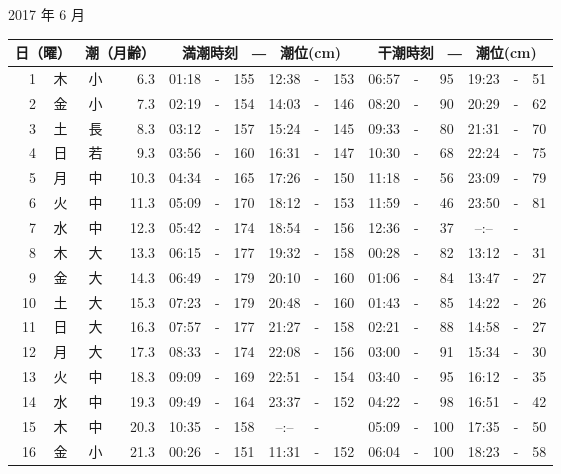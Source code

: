 \documentclass[12pt.a4j]{jsarticle}
\begin{document}
\begin{center}
 {\large 2017 年  6 月}\\
 \begin{table}[ht]
    \begin{tabular}{|rc|cr|ccrccr|ccrccr|}
    \hline
    \multicolumn{2}{|c|}{日（曜）} & \multicolumn{2}{c|}{潮（月齢）} & \multicolumn{6}{c|}{満潮時刻　―　潮位(cm)} & \multicolumn{6}{c|}{干潮時刻　―　潮位(cm)} \\
 \hline
 1 & 木 & 小 &  6.3 &  01:18 &-& 155  &  12:38 &-& 153  &   06:57 &-&  95  &   19:23 &-&  51  \\
 2 & 金 & 小 &  7.3 &  02:19 &-& 154  &  14:03 &-& 146  &   08:20 &-&  90  &   20:29 &-&  62  \\
 3 & 土 & 長 &  8.3 &  03:12 &-& 157  &  15:24 &-& 145  &   09:33 &-&  80  &   21:31 &-&  70  \\
 4 & 日 & 若 &  9.3 &  03:56 &-& 160  &  16:31 &-& 147  &   10:30 &-&  68  &   22:24 &-&  75  \\
 5 & 月 & 中 & 10.3 &  04:34 &-& 165  &  17:26 &-& 150  &   11:18 &-&  56  &   23:09 &-&  79  \\
 6 & 火 & 中 & 11.3 &  05:09 &-& 170  &  18:12 &-& 153  &   11:59 &-&  46  &   23:50 &-&  81  \\
 7 & 水 & 中 & 12.3 &  05:42 &-& 174  &  18:54 &-& 156  &   12:36 &-&  37  &   --:-- &-&     \\
 8 & 木 & 大 & 13.3 &  06:15 &-& 177  &  19:32 &-& 158  &   00:28 &-&  82  &   13:12 &-&  31  \\
 9 & 金 & 大 & 14.3 &  06:49 &-& 179  &  20:10 &-& 160  &   01:06 &-&  84  &   13:47 &-&  27  \\
10 & 土 & 大 & 15.3 &  07:23 &-& 179  &  20:48 &-& 160  &   01:43 &-&  85  &   14:22 &-&  26  \\
11 & 日 & 大 & 16.3 &  07:57 &-& 177  &  21:27 &-& 158  &   02:21 &-&  88  &   14:58 &-&  27  \\
12 & 月 & 大 & 17.3 &  08:33 &-& 174  &  22:08 &-& 156  &   03:00 &-&  91  &   15:34 &-&  30  \\
13 & 火 & 中 & 18.3 &  09:09 &-& 169  &  22:51 &-& 154  &   03:40 &-&  95  &   16:12 &-&  35  \\
14 & 水 & 中 & 19.3 &  09:49 &-& 164  &  23:37 &-& 152  &   04:22 &-&  98  &   16:51 &-&  42  \\
15 & 木 & 中 & 20.3 &  10:35 &-& 158  &  --:-- &-&     &   05:09 &-& 100  &   17:35 &-&  50  \\
16 & 金 & 小 & 21.3 &  00:26 &-& 151  &  11:31 &-& 152  &   06:04 &-& 100  &   18:23 &-&  58  \\

\end{tabular}
\end{table}
\end{center}
\end{document}
